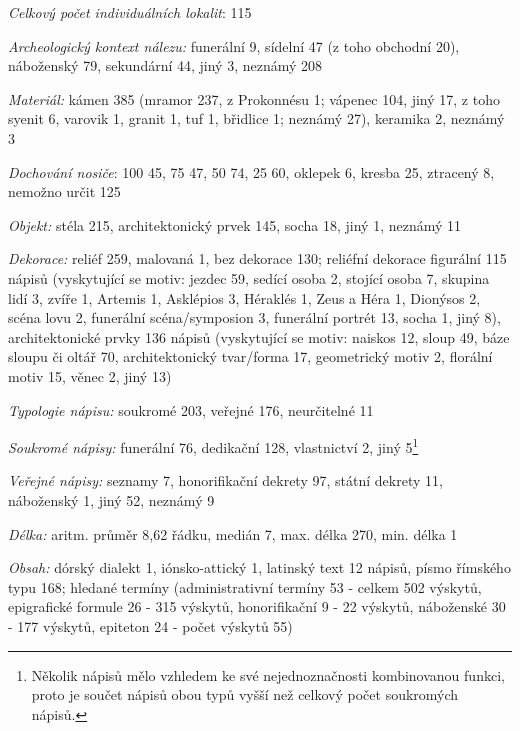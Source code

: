 {\em Celkový počet individuálních lokalit}: 115

{\em Archeologický kontext nálezu:} funerální 9, sídelní 47 (z toho obchodní 20), náboženský 79, sekundární 44, jiný 3, neznámý 208

{\em Materiál:} kámen 385 (mramor 237, z Prokonnésu 1; vápenec 104, jiný 17, z toho syenit 6, varovik 1, granit 1, tuf 1, břidlice 1; neznámý 27), keramika 2, neznámý 3

{\em Dochování nosiče}: 100  45, 75  47, 50  74, 25  60, oklepek 6, kresba 25, ztracený 8, nemožno určit 125

{\em Objekt:} stéla 215, architektonický prvek 145, socha 18, jiný 1, neznámý 11

{\em Dekorace:} reliéf 259, malovaná 1, bez dekorace 130; reliéfní dekorace figurální 115 nápisů (vyskytující se motiv: jezdec 59, sedící osoba 2, stojící osoba 7, skupina lidí 3, zvíře 1, Artemis 1, Asklépios 3, Héraklés 1, Zeus a Héra 1, Dionýsos 2, scéna lovu 2, funerální scéna/symposion 3, funerální portrét 13, socha 1, jiný 8), architektonické prvky 136 nápisů (vyskytující se motiv: naiskos 12, sloup 49, báze sloupu či oltář 70, architektonický tvar/forma 17, geometrický motiv 2, florální motiv 15, věnec 2, jiný 13)

{\em Typologie nápisu:} soukromé 203, veřejné 176, neurčitelné 11

{\em Soukromé nápisy:} funerální 76, dedikační 128, vlastnictví 2, jiný 5\footnote{Několik nápisů mělo vzhledem ke své nejednoznačnosti kombinovanou funkci, proto je součet nápisů obou typů vyšší než celkový počet soukromých nápisů.}

{\em Veřejné nápisy:} seznamy 7, honorifikační dekrety 97, státní dekrety 11, náboženský 1, jiný 52, neznámý 9

{\em Délka:} aritm. průměr 8,62 řádku, medián 7, max. délka 270, min. délka 1

{\em Obsah:} dórský dialekt 1, iónsko-attický 1, latinský text 12 nápisů, písmo římského typu 168; hledané termíny (administrativní termíny 53 - celkem 502 výskytů, epigrafické formule 26 - 315 výskytů, honorifikační 9 - 22 výskytů, náboženské 30 - 177 výskytů, epiteton 24 - počet výskytů 55)

